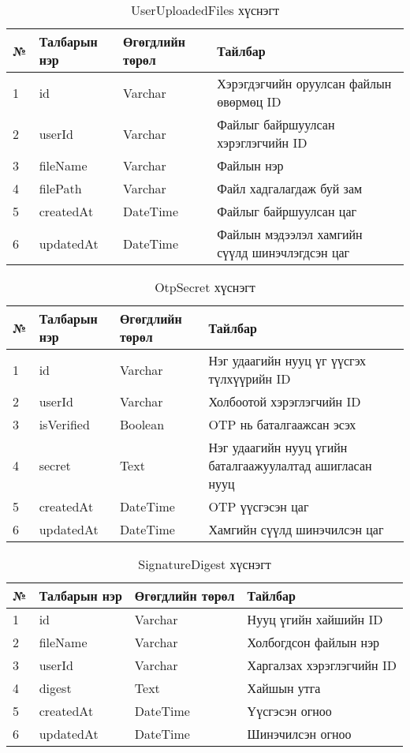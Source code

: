 \begin{table}[h]
	\caption{UserUploadedFiles хүснэгт}
	\begin{tabular}{|l|l|l|p{8cm}|}
	\hline
	№ &  Талбарын нэр & Өгөгдлийн төрөл & Тайлбар \\ \hline
	1 &  id & Varchar & Хэрэгдэгчийн оруулсан файлын өвөрмөц ID\\ \hline
	2 &  userId & Varchar & Файлыг байршуулсан хэрэглэгчийн ID \\ \hline
	3 &  fileName & Varchar & Файлын нэр\\ \hline
	4 &  filePath & Varchar & Файл хадгалагдаж буй зам \\ \hline
	5 &  createdAt & DateTime & Файлыг байршуулсан цаг \\ \hline
	6 &  updatedAt & DateTime & Файлын мэдээлэл хамгийн сүүлд шинэчлэгдсэн цаг \\ \hline
\end{tabular}
\end{table}

\begin{table}[h]
	\caption{OtpSecret хүснэгт}
	\begin{tabular}{|l|l|l|p{8cm}|}
	\hline
	№ &  Талбарын нэр & Өгөгдлийн төрөл & Тайлбар \\ \hline
	1 &  id & Varchar & Нэг удаагийн нууц үг үүсгэх түлхүүрийн ID\\ \hline
	2 &  userId & Varchar & Холбоотой хэрэглэгчийн ID \\ \hline
	3 &  isVerified & Boolean & OTP нь баталгаажсан эсэх \\ \hline
	4 &  secret & Text & Нэг удаагийн нууц үгийн баталгаажуулалтад ашигласан нууц \\ \hline
	5 &  createdAt & DateTime & OTP үүсгэсэн цаг\\ \hline
	6 &  updatedAt & DateTime & Хамгийн сүүлд шинэчилсэн цаг\\ \hline
\end{tabular}
\end{table}

\begin{table}[h]
	\caption{SignatureDigest хүснэгт}
	\begin{tabular}{|l|l|l|p{8cm}|}
	\hline
	№ &  Талбарын нэр & Өгөгдлийн төрөл & Тайлбар \\ \hline
	1 &  id & Varchar & Нууц үгийн хайшийн ID\\ \hline
	2 &  fileName & Varchar & Холбогдсон файлын нэр \\ \hline
	3 &  userId & Varchar & Харгалзах хэрэглэгчийн ID\\ \hline
	4 &  digest & Text & Хайшын утга \\ \hline
	5 &  createdAt & DateTime & Үүсгэсэн огноо \\ \hline
	6 &  updatedAt & DateTime & Шинэчилсэн огноо \\ \hline
\end{tabular}
\end{table}
